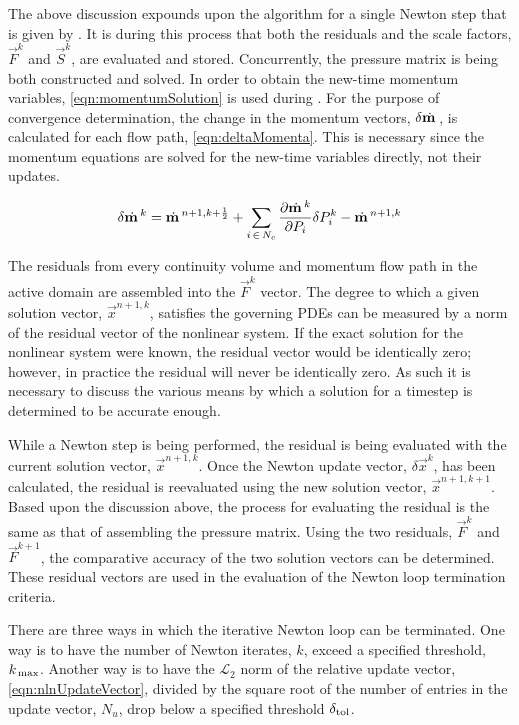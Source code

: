 The above discussion expounds upon the algorithm for a single Newton step that is given by .
It is during this process that both the residuals and the scale factors, $\vec{F}^{k}$ and $\vec{S}^{k}$, are evaluated and stored.
Concurrently, the pressure matrix is being both constructed and solved.
In order to obtain the new-time momentum variables, \eqref{eqn:momentumSolution} is used during .
For the purpose of convergence determination, the change in the momentum vectors, $\delta \momVec{}$, is calculated for each flow path, \eqref{eqn:deltaMomenta}.
This is necessary since the momentum equations are solved for the new-time variables directly, not their updates.

\begin{equation}
\label{eqn:deltaMomenta}
\delta \momVec{}^{k} = \momVec{}^{n+1,k + \onehalf} + \sum_{i \, \in \, N_{c} } \frac{\partial \momVec{}^{k}}{\partial P_{i}} \delta P^{k}_{i} - \momVec{}^{n+1, k}
\end{equation}

The residuals from every continuity volume and momentum flow path in the active domain are assembled into the $\vec{F}^{k}$ vector.
The degree to which a given solution vector, $\vec{x}^{n+1, k}$, satisfies the governing PDEs can be measured by a norm of the residual vector of the nonlinear system.
If the exact solution for the nonlinear system were known, the residual vector would be identically zero; however, in practice the residual will never be identically zero.
As such it is necessary to discuss the various means by which a solution for a timestep is determined to be accurate enough.

While a Newton step is being performed, the residual is being evaluated with the current solution vector, $\vec{x}^{n+1,k}$.
Once the Newton update vector, $\delta \vec{x}^{k}$, has been calculated, the residual is reevaluated using the new solution vector, $\vec{x}^{n+1, k+1}$.
Based upon the discussion above, the process for evaluating the residual is the same as that of assembling the pressure matrix.
Using the two residuals, $\vec{F}^{k}$ and $\vec{F}^{k+1}$, the comparative accuracy of the two solution vectors can be determined.
These residual vectors are used in the evaluation of the Newton loop termination criteria.

There are three ways in which the iterative Newton loop can be terminated.
One way is to have the number of Newton iterates, $k$, exceed a specified threshold, $\kmax{}$.
Another way is to have the $\mathcal{L}_{2}$ norm of the relative update vector, \eqref{eqn:nlnUpdateVector}, divided by the square root of the number of entries in the update vector, $N_{u}$, drop below a specified threshold $\dtol{}$.

